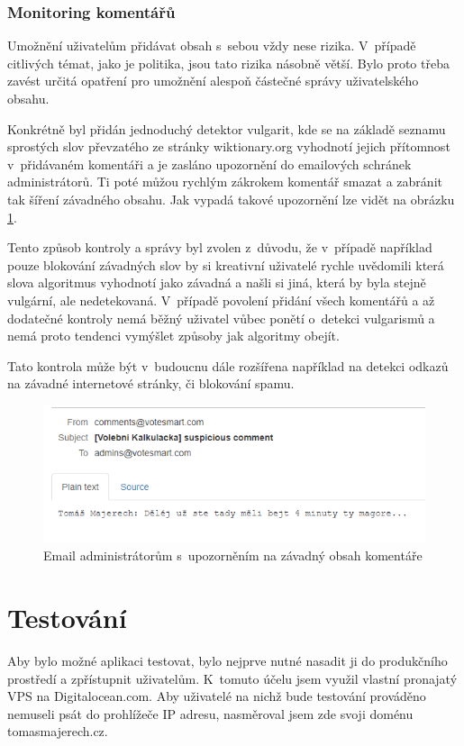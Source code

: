 \subsection{Monitoring komentářů}
Umožnění uživatelům přidávat obsah s~sebou vždy nese rizika. V~případě citlivých témat, jako je politika, jsou tato rizika násobně větší. Bylo proto třeba zavést určitá opatření pro umožnění alespoň částečné správy uživatelského obsahu. 
\par Konkrétně byl přidán jednoduchý detektor vulgarit, kde se na základě seznamu sprostých slov převzatého ze stránky wiktionary.org \cite{wiktionary-vulgarity} vyhodnotí jejich přítomnost v~přidávaném komentáři a je zasláno upozornění do emailových schránek administrátorů. Ti poté můžou rychlým zákrokem komentář smazat a zabránit tak šíření závadného obsahu. Jak vypadá takové upozornění lze vidět na obrázku \ref{fig:aplikace-komentar}.
\par Tento způsob kontroly a správy byl zvolen z~důvodu, že v~případě například pouze blokování závadných slov by si kreativní uživatelé rychle uvědomili která slova algoritmus vyhodnotí jako závadná a našli si jiná, která by byla stejně vulgární, ale nedetekovaná. V~případě povolení přidání všech komentářů a až dodatečné kontroly nemá běžný uživatel vůbec ponětí o~detekci vulgarismů a nemá proto tendenci vymýšlet způsoby jak algoritmy obejít.

\par Tato kontrola může být v~budoucnu dále rozšířena například na detekci odkazů na závadné internetové stránky, či blokování spamu.

\begin{figure}
    \centering
    \includegraphics[width=1\textwidth]{obrazky-figures/aplikace-komentar.png}
    \caption{Email administrátorům s~upozorněním na závadný obsah komentáře}
    \label{fig:aplikace-komentar}
\end{figure}


\chapter{Testování}
\label{chap:testovani}
Aby bylo možné aplikaci testovat, bylo nejprve nutné nasadit ji do produkčního prostředí a zpřístupnit uživatelům. K~tomuto účelu jsem využil vlastní pronajatý VPS na Digitalocean.com. Aby uživatelé na nichž bude testování prováděno nemuseli psát do prohlížeče IP adresu, nasměroval jsem zde svoji doménu tomasmajerech.cz. 

